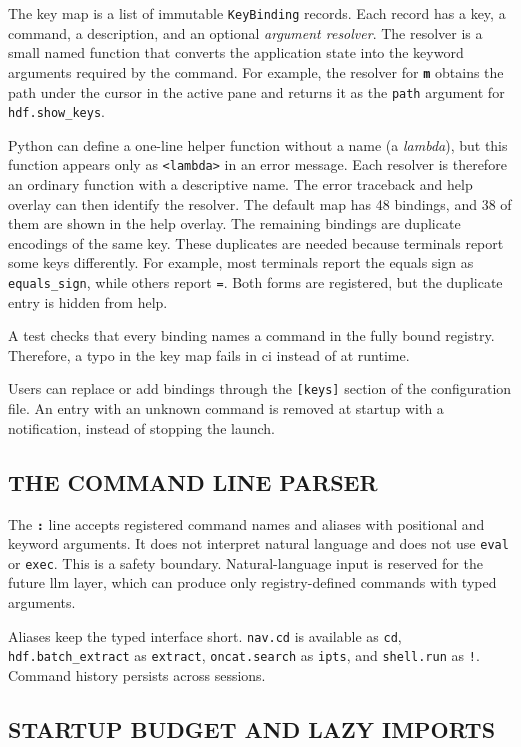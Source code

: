 \documentclass[tm]{ornltm}
\newcommand{\cmd}[1]{\texttt{#1}}
\newcommand{\key}[1]{\textbf{\texttt{#1}}}
\begin{document}
The key map is a list of immutable \texttt{KeyBinding} records. Each record has
a key, a command, a description, and an optional \emph{argument resolver}. The
resolver is a small named function that converts the application state into the
keyword arguments required by the command. For example, the resolver for
\key{m} obtains the path under the cursor in the active pane and returns it as
the \texttt{path} argument for \cmd{hdf.show\_keys}.

Python can define a one-line helper function without a name (a \emph{lambda}),
but this function appears only as \texttt{<lambda>} in an error message. Each
resolver is therefore an ordinary function with a descriptive name. The error
traceback and help overlay can then identify the resolver. The default map has
48 bindings, and 38 of them are shown in the help overlay. The remaining
bindings are duplicate encodings of the same key. These duplicates are needed
because terminals report some keys differently. For example, most terminals
report the equals sign as \texttt{equals\_sign}, while others report
\texttt{=}. Both forms are registered, but the duplicate entry is hidden from
help.

A test checks that every binding names a command in the fully bound registry.
Therefore, a typo in the key map fails in \ac{ci} instead of at runtime.

Users can replace or add bindings through the \texttt{[keys]} section of the
configuration file. An entry with an unknown command is removed at startup with
a notification, instead of stopping the launch.

\subsection{THE COMMAND LINE PARSER}

The \key{:} line accepts registered command names and aliases with positional
and keyword arguments. It does not interpret natural language and does not use
\texttt{eval} or \texttt{exec}. This is a safety boundary. Natural-language
input is reserved for the future \ac{llm} layer, which can produce only
registry-defined commands with typed arguments.

Aliases keep the typed interface short. \cmd{nav.cd} is available as
\texttt{cd}, \cmd{hdf.batch\_extract} as \texttt{extract},
\cmd{oncat.search} as \texttt{ipts}, and \cmd{shell.run} as \texttt{!}.
Command history persists across sessions.

\subsection{STARTUP BUDGET AND LAZY IMPORTS}
\label{sec:startup}
\end{document}
